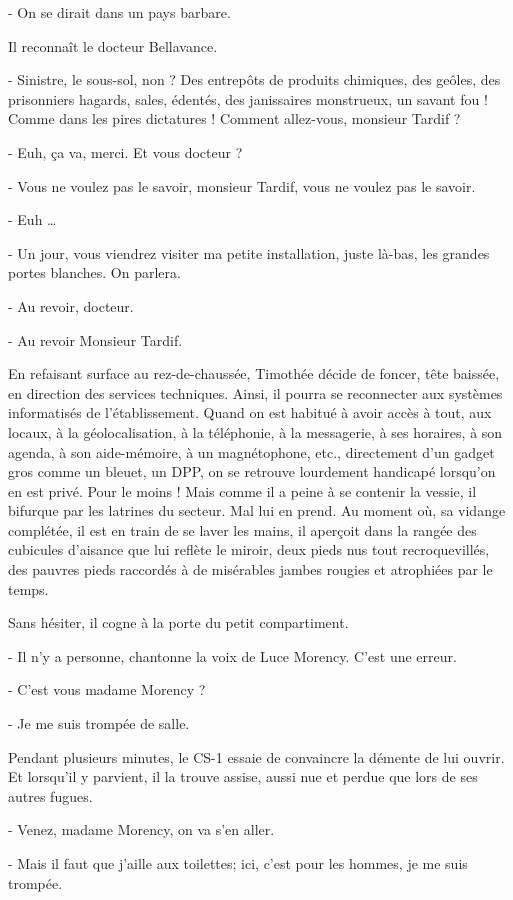 - On se dirait dans un pays barbare.

Il reconnaît le docteur Bellavance.

- Sinistre, le sous-sol, non ? Des entrepôts de produits chimiques, des geôles, des prisonniers hagards, sales, édentés, des janissaires monstrueux, un savant fou ! Comme dans les pires dictatures ! Comment allez-vous, monsieur Tardif ?

- Euh, ça va, merci. Et vous docteur ?

- Vous ne voulez pas le savoir, monsieur Tardif, vous ne voulez pas le savoir.

- Euh …

- Un jour, vous viendrez visiter ma petite installation, juste là-bas, les grandes portes blanches. On parlera.

- Au revoir, docteur.

- Au revoir Monsieur Tardif.

En refaisant surface au rez-de-chaussée, Timothée décide de foncer, tête baissée, en direction des services techniques. Ainsi, il pourra se reconnecter aux systèmes informatisés de l’établissement. Quand on est habitué à avoir accès à tout, aux locaux, à la géolocalisation, à la téléphonie, à la messagerie, à ses horaires, à son agenda, à son aide-mémoire, à un magnétophone, etc., directement d’un gadget gros comme un bleuet, un DPP, on se retrouve lourdement handicapé lorsqu’on en est privé. Pour le moins ! Mais comme il a peine à se contenir la vessie, il bifurque par les latrines du secteur. Mal lui en prend. Au moment où, sa vidange complétée, il est en train de se laver les mains, il aperçoit dans la rangée des cubicules d’aisance que lui reflète le miroir, deux pieds nus tout recroquevillés, des pauvres pieds raccordés à de misérables jambes rougies et atrophiées par le temps.

Sans hésiter, il cogne à la porte du petit compartiment.

- Il n’y a personne, chantonne la voix de Luce Morency. C’est une erreur.

- C’est vous madame Morency ?

- Je me suis trompée de salle.

Pendant plusieurs minutes, le CS-1 essaie de convaincre la démente de lui ouvrir. Et lorsqu’il y parvient, il la trouve assise, aussi nue et perdue que lors de ses autres fugues.

- Venez, madame Morency, on va s’en aller.

- Mais il faut que j’aille aux toilettes; ici, c’est pour les hommes, je me suis trompée.

